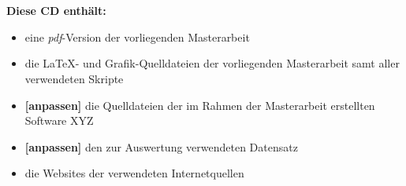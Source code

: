 \chapter*{}
\thispagestyle{empty}

\begin{center}
  \vspace{-3cm}
\end{center}

\vfill

\textbf{Diese CD enthält:}
\begin{itemize}
 \item eine \emph{pdf}-Version der vorliegenden Masterarbeit
 \item die \LaTeX- und Grafik-Quelldateien der vorliegenden Masterarbeit samt aller verwendeten Skripte
 \item \textbf{[anpassen]} die Quelldateien der im Rahmen der Masterarbeit erstellten Software XYZ
 \item \textbf{[anpassen]} den zur Auswertung verwendeten Datensatz
 \item die Websites der verwendeten Internetquellen
\end{itemize}
